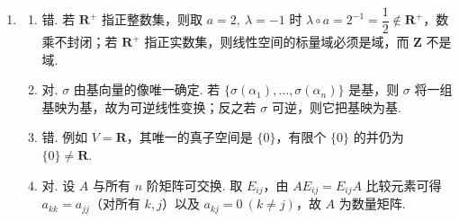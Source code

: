 \begin{enumerate}
    \item
    \begin{enumerate}
        \item 错. 若 $\mathbf{R}^+$ 指正整数集，则取 $a=2,\ \lambda=-1$ 时 $\lambda\circ a=2^{-1}=\dfrac12\notin\mathbf{R}^+$，数乘不封闭；若 $\mathbf{R}^+$ 指正实数集，则线性空间的标量域必须是域，而 $\mathbf{Z}$ 不是域.

        \item 对. $\sigma$ 由基向量的像唯一确定. 若 $\{\sigma(\alpha_1),\ldots,\sigma(\alpha_n)\}$ 是基，则 $\sigma$ 将一组基映为基，故为可逆线性变换；反之若 $\sigma$ 可逆，则它把基映为基.

        \item 错. 例如 $V=\mathbf{R}$，其唯一的真子空间是 $\{0\}$，有限个 $\{0\}$ 的并仍为 $\{0\}\neq\mathbf{R}$.

        \item 对. 设 $A$ 与所有 $n$ 阶矩阵可交换. 取 $E_{ij}$，由 $AE_{ij}=E_{ij}A$ 比较元素可得 $a_{kk}=a_{jj}$（对所有 $k,j$）以及 $a_{kj}=0\ (k\neq j)$，故 $A$ 为数量矩阵.
    \end{enumerate}
\end{enumerate}

\clearpage
